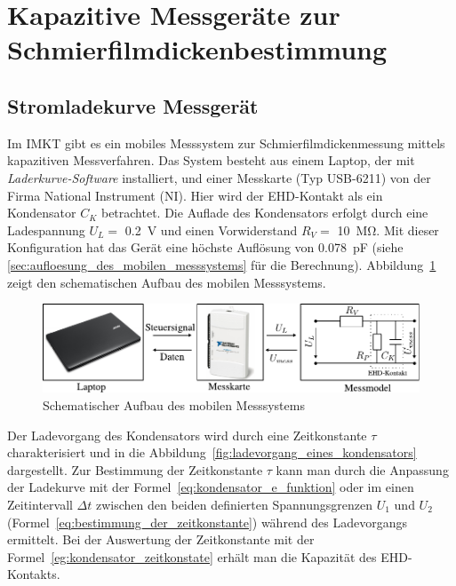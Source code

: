 \section{Kapazitive Messgeräte zur Schmierfilmdickenbestimmung}
\label{sec:kapazitive_messgeraete_zur_schmierfilmdickenbestimmung}

\subsection{Stromladekurve Messgerät}
\label{sub:stromladekurve_messgeraet}

Im IMKT gibt es ein mobiles Messsystem zur Schmierfilmdickenmessung mittels kapazitiven Messverfahren.
Das System besteht aus einem Laptop, der mit \textit{Laderkurve-Software} installiert, und einer Messkarte (Typ USB-6211) von der Firma National Instrument (NI).
Hier wird der EHD-Kontakt als ein Kondensator $C_K$ betrachtet.
Die Auflade des Kondensators erfolgt durch eine Ladespannung $U_L =$ \SI{0,2}{\volt} und einen Vorwiderstand $R_V =$ \SI{10}{\mega\ohm}.
Mit dieser Konfiguration hat das Gerät eine höchste Auflösung von \SI{0.078}{\pico\farad} (siehe \ref{sec:aufloesung_des_mobilen_messsystems} für die Berechnung).
Abbildung~\ref{fig:schematischer_aufbau_des_mobilen_messsystems} zeigt den schematischen Aufbau des mobilen Messsystems.
\begin{figure}[htb]
    \centering
    \includegraphics[]{./images/schematischer_aufbau_des_mobilen_messsystem.pdf}
    \caption{Schematischer Aufbau des mobilen Messsystems}
    \label{fig:schematischer_aufbau_des_mobilen_messsystems}
\end{figure}

Der Ladevorgang des Kondensators wird durch eine Zeitkonstante $\tau$ charakterisiert und in die Abbildung~\ref{fig:ladevorgang_eines_kondensators} dargestellt.
Zur Bestimmung der Zeitkonstante $\tau$ kann man durch die Anpassung der Ladekurve mit der Formel~\ref{eq:kondensator_e_funktion} oder im einen Zeitintervall $\Delta t$ zwischen den beiden definierten Spannungsgrenzen $U_1$ und $U_2$ (Formel~\ref{eq:bestimmung_der_zeitkonstante}) während des Ladevorgangs ermittelt.
Bei der Auswertung der Zeitkonstante mit der Formel~\ref{eg:kondensator_zeitkonstate} erhält man die Kapazität des EHD-Kontakts.

